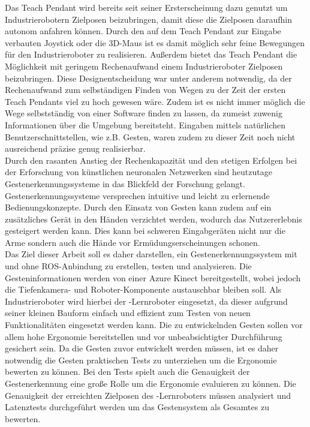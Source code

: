 Das Teach Pendant wird bereits seit seiner Ersterscheinung dazu genutzt um Industrierobotern Zielposen beizubringen, damit diese die Zielposen daraufhin autonom anfahren können. Durch den auf dem Teach Pendant zur Eingabe verbauten Joystick oder die 3D-Maus ist es damit möglich sehr feine Bewegungen für den Industrieroboter zu realisieren. Außerdem bietet das Teach Pendant die Möglichkeit mit geringem Rechenaufwand einem Industrieroboter Zielposen beizubringen. Diese Designentscheidung war unter anderem notwendig, da der Rechenaufwand zum selbständigen Finden von Wegen zu der Zeit der ersten Teach Pendants viel zu hoch gewesen wäre. Zudem ist es nicht immer möglich die Wege selbstständig von einer Software finden zu lassen, da zumeist zuwenig Informationen über die Umgebung bereitsteht. Eingaben mittels natürlichen Benutzerschnittstellen, wie z.B. Gesten, waren zudem zu dieser Zeit noch nicht ausreichend präzise genug realisierbar.\\

Durch den rasanten Anstieg der Rechenkapazität und den stetigen Erfolgen bei der Erforschung von künstlichen neuronalen Netzwerken sind heutzutage Gestenerkennungssysteme in das Blickfeld der Forschung gelangt. Gestenerkennungssysteme versprechen intuitive und leicht zu erlernende Bedienungskonzepte. Durch den Einsatz von Gesten kann zudem auf ein zusätzliches Gerät in den Händen verzichtet werden, wodurch das Nutzererlebnis gesteigert werden kann. Dies kann bei schweren Eingabgeräten nicht nur die Arme sondern auch die Hände vor Ermüdungserscheinungen schonen.\\

Das Ziel dieser Arbeit soll es daher darstellen, ein Gestenerkennungssystem mit und ohne ROS-Anbindung zu erstellen, testen und analysieren. Die Gesteninformationen werden von einer Azure Kinect bereitgestellt, wobei jedoch die Tiefenkamera- und Roboter-Komponente austauschbar bleiben soll. Als Industrieroboter wird hierbei der -Lernroboter eingesetzt, da dieser aufgrund seiner kleinen Bauform einfach und effizient zum Testen von neuen Funktionalitäten eingesetzt werden kann. Die zu entwickelnden Gesten sollen vor allem hohe Ergonomie bereitstellen und vor unbeabsichtigter Durchführung gesichert sein. Da die Gesten zuvor entwickelt werden müssen, ist es daher notwendig die Gesten praktischen Tests zu unterziehen um die Ergonomie bewerten zu können. Bei den Tests spielt auch die Genauigkeit der Gestenerkennung eine große Rolle um die Ergonomie evaluieren zu können. Die Genauigkeit der erreichten Zielposen des -Lernroboters müssen analysiert und Latenztests durchgeführt werden um das Gestensystem als Gesamtes zu bewerten.
